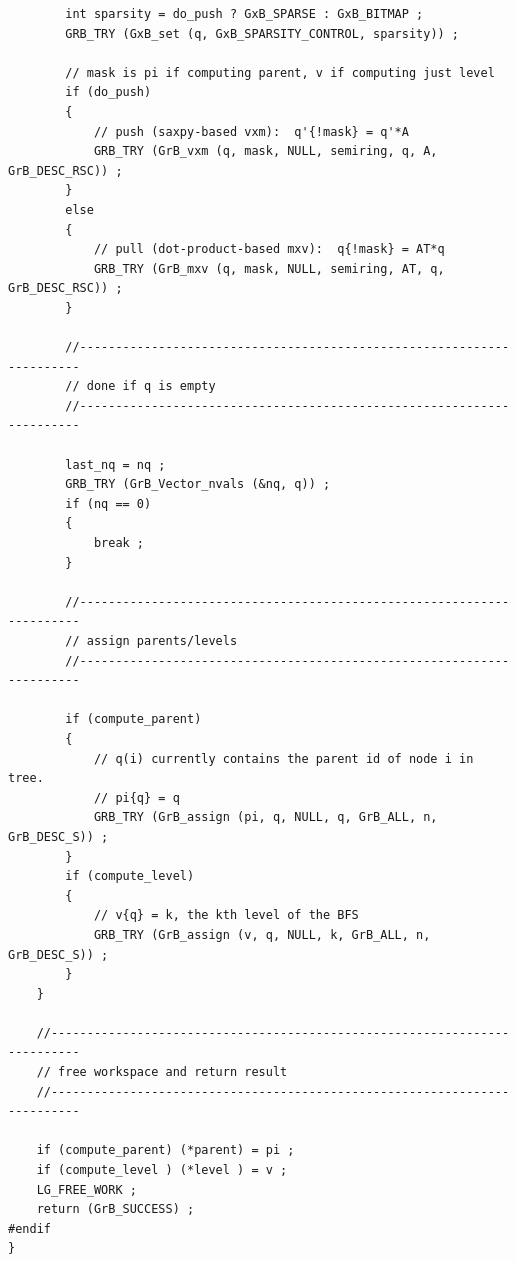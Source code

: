 \begin{verbatim}
        int sparsity = do_push ? GxB_SPARSE : GxB_BITMAP ;
        GRB_TRY (GxB_set (q, GxB_SPARSITY_CONTROL, sparsity)) ;

        // mask is pi if computing parent, v if computing just level
        if (do_push)
        {
            // push (saxpy-based vxm):  q'{!mask} = q'*A
            GRB_TRY (GrB_vxm (q, mask, NULL, semiring, q, A, GrB_DESC_RSC)) ;
        }
        else
        {
            // pull (dot-product-based mxv):  q{!mask} = AT*q
            GRB_TRY (GrB_mxv (q, mask, NULL, semiring, AT, q, GrB_DESC_RSC)) ;
        }

        //----------------------------------------------------------------------
        // done if q is empty
        //----------------------------------------------------------------------

        last_nq = nq ;
        GRB_TRY (GrB_Vector_nvals (&nq, q)) ;
        if (nq == 0)
        {
            break ;
        }

        //----------------------------------------------------------------------
        // assign parents/levels
        //----------------------------------------------------------------------

        if (compute_parent)
        {
            // q(i) currently contains the parent id of node i in tree.
            // pi{q} = q
            GRB_TRY (GrB_assign (pi, q, NULL, q, GrB_ALL, n, GrB_DESC_S)) ;
        }
        if (compute_level)
        {
            // v{q} = k, the kth level of the BFS
            GRB_TRY (GrB_assign (v, q, NULL, k, GrB_ALL, n, GrB_DESC_S)) ;
        }
    }

    //--------------------------------------------------------------------------
    // free workspace and return result
    //--------------------------------------------------------------------------

    if (compute_parent) (*parent) = pi ;
    if (compute_level ) (*level ) = v ;
    LG_FREE_WORK ;
    return (GrB_SUCCESS) ;
#endif
}
\end{verbatim}
